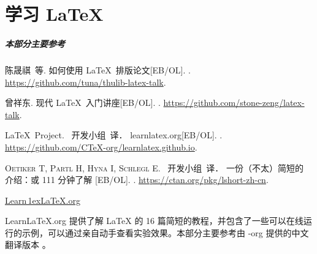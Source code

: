 
\part{学习 \LaTeX{}}

\begin{frame}
  \frametitle{本部分主要参考}
  \begin{bibliolist}{00}
    \onlineitem 陈晟祺~等.
    \newblock 如何使用 \LaTeX\ 排版论文[EB/OL].
    . \url{https://github.com/tuna/thulib-latex-talk}.

    \onlineitem 曾祥东.
    \newblock 现代 \LaTeX\ 入门讲座[EB/OL].
    . \url{https://github.com/stone-zeng/latex-talk}.

    \onlineitem \LaTeX\ Project.
    \CTeX\ 开发小组~译．
    \newblock learnlatex.org[EB/OL].
    . \url{https://github.com/CTeX-org/learnlatex.github.io}.

    \onlineitem \textsc{Oetiker T}, \textsc{Partl H}, \textsc{Hyna I}, \textsc{Schlegl E}.
    \CTeX\ 开发小组~译．
    \newblock 一份（不太）简短的 \LaTeXe{} 介绍：或 111 分钟了解 \LaTeXe{}[EB/OL]. \newblock{}.
    \url{https://ctan.org/pkg/lshort-zh-cn}.
  \end{bibliolist}

\end{frame}

\begin{frame}[plain]
  \vfil
  \begin{center}
    \href{https://learnlatex.org}{
      \rmfamily
      Learn\,\lower1ex\hbox{\Huge\LaTeX{}}.org
    }
  \end{center}
  \vfil
  \begin{center}
    \parbox{0.75\linewidth}{
      Learn\LaTeX{}.org 提供了解 \LaTeX{} 的 16 篇简短的教程，并包含了一些可以在线运行的示例，可以通过亲自动手查看实验效果。本部分主要参考由 \CTeX{}-org 提供的中文翻译版本 。
    }
  \end{center}
  \vfil
\end{frame}

\begin{shadedsection}











\end{shadedsection}
